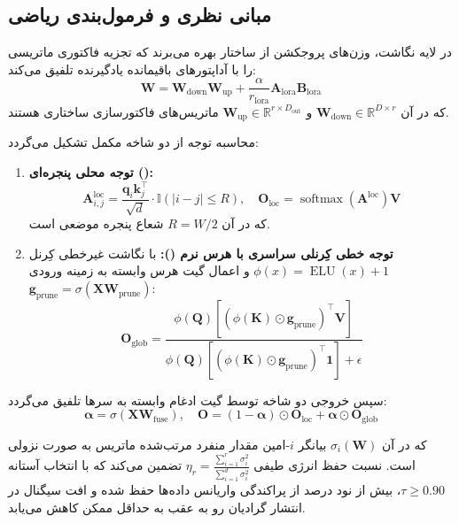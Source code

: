 \subsection{مبانی نظری و فرمول‌بندی ریاضی}
در لایه نگاشت، وزن‌های پروجکشن از ساختار  بهره می‌برند که تجزیه فاکتوری ماتریسی را با آداپتورهای باقیمانده یادگیرنده تلفیق می‌کند:
\begin{equation}
\mathbf{W} = \mathbf{W}_{\text{down}} \mathbf{W}_{\text{up}} + \frac{\alpha}{r_{\text{lora}}} \mathbf{A}_{\text{lora}} \mathbf{B}_{\text{lora}}
\end{equation}
که در آن $\mathbf{W}_{\text{down}} \in \mathbb{R}^{D \times r}$ و $\mathbf{W}_{\text{up}} \in \mathbb{R}^{r \times D_{\text{out}}}$ ماتریس‌های فاکتورسازی ساختاری هستند.

محاسبه توجه از دو شاخه مکمل تشکیل می‌گردد:
\begin{enumerate}
    \item \textbf{توجه محلی پنجره‌ای ():}
    \begin{equation}
    \mathbf{A}_{i,j}^{\text{loc}} = \frac{\mathbf{q}_i \mathbf{k}_j^\top}{\sqrt{d}} \cdot \mathbb{I}(|i - j| \le R), \quad \mathbf{O}_{\text{loc}} = \operatorname{softmax}\left(\mathbf{A}^{\text{loc}}\right) \mathbf{V}
    \end{equation}
    که در آن $R = W / 2$ شعاع پنجره موضعی است.
    \item \textbf{توجه خطی کِرنلی سراسری با هرس نرم ():} با نگاشت غیرخطی کِرنل $\phi(x) = \operatorname{ELU}(x) + 1$ و اعمال گیت هرس وابسته به زمینه ورودی $\mathbf{g}_{\text{prune}} = \sigma(\mathbf{X} \mathbf{W}_{\text{prune}})$:
    \begin{equation}
    \mathbf{O}_{\text{glob}} = \frac{\phi(\mathbf{Q}) \left[ (\phi(\mathbf{K}) \odot \mathbf{g}_{\text{prune}})^\top \mathbf{V} \right]}{\phi(\mathbf{Q}) \left[ (\phi(\mathbf{K}) \odot \mathbf{g}_{\text{prune}})^\top \mathbf{1} \right] + \epsilon}
    \end{equation}
\end{enumerate}
سپس خروجی دو شاخه توسط گیت ادغام وابسته به سرها تلفیق می‌گردد:
\begin{equation}
\boldsymbol{\alpha} = \sigma(\mathbf{X} \mathbf{W}_{\text{fuse}}), \quad \mathbf{O} = (1 - \boldsymbol{\alpha}) \odot \mathbf{O}_{\text{loc}} + \boldsymbol{\alpha} \odot \mathbf{O}_{\text{glob}}
\end{equation}

که در آن $\sigma_i(\mathbf{W})$ بیانگر $i$-امین مقدار منفرد مرتب‌شده ماتریس به صورت نزولی است. نسبت حفظ انرژی طیفی $\eta_r = \frac{\sum_{i=1}^r \sigma_i^2}{\sum_{i=1}^{d} \sigma_i^2}$ تضمین می‌کند که با انتخاب آستانه $\tau \ge 0.90$، بیش از نود درصد از پراکندگی واریانس داده‌ها حفظ شده و افت سیگنال در انتشار گرادیان رو به عقب به حداقل ممکن کاهش می‌یابد.

